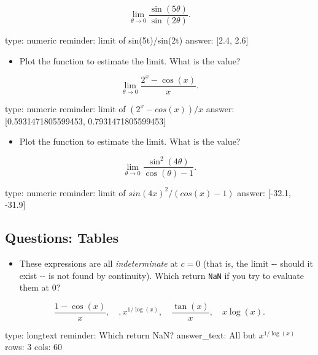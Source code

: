 \documentclass[12pt]{article}
\begin{document}
\[
\lim_{\theta \rightarrow 0} \frac{\sin(5\theta)}{\sin(2\theta)}.
\]

\begin{answer}
    type: numeric
    reminder: limit of sin(5t)/sin(2t)
    answer: [2.4, 2.6]

\end{answer}

\begin{itemize}
\itemsep1pt\parskip0pt
\item
  Plot the function to estimate the limit. What is the value?
\end{itemize}

\[
\lim_{\theta \rightarrow 0} \frac{2^x - \cos(x)}{x}.
\]

\begin{answer}
    type: numeric
    reminder: limit of \( (2^x  - cos(x))/x \)
    answer: [0.5931471805599453, 0.7931471805599453]

\end{answer}

\begin{itemize}
\itemsep1pt\parskip0pt
\item
  Plot the function to estimate the limit. What is the value?
\end{itemize}

\[
\lim_{\theta \rightarrow 0} \frac{\sin^2(4\theta)}{\cos(\theta) - 1}.
\]

\begin{answer}
    type: numeric
    reminder: limit of \( sin(4x)^2 / (cos(x) - 1) \)
    answer: [-32.1, -31.9]

\end{answer}

\subsection{Questions: Tables}

\begin{itemize}
\itemsep1pt\parskip0pt
\item
  These expressions are all \emph{indeterminate} at $c=0$ (that is, the
  limit -{}- should it exist -{}- is not found by continuity). Which
  return \texttt{NaN} if you try to evaluate them at $0$?
\end{itemize}

\[
\frac{1-\cos(x)}{x}, \quad, x^{1/\log(x)}, \quad \frac{\tan(x)}{x},\quad x\log(x).
\]

\begin{answer}
type: longtext
reminder: Which return NaN?
answer_text: All but \( x^{1/\log(x)} \) 
rows: 3
cols: 60
\end{answer}
\end{document}
